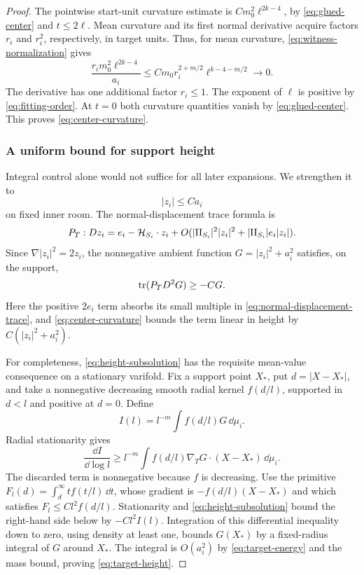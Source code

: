 \begin{proof}
The pointwise start-unit curvature estimate is
$Cm_0^2\ell^{2k-4}$, by \eqref{eq:glued-center} and $t\le2\ell$.
Mean curvature and its first normal derivative acquire factors
$r_i$ and $r_i^2$, respectively, in target units. Thus, for mean
curvature, \eqref{eq:witness-normalization} gives
\[
 \frac{r_i m_0^2\ell^{2k-4}}{a_i}
       \le Cm_0r_i^{2+m/2}\ell^{k-4-m/2}\longrightarrow0.
\]
The derivative has one additional factor $r_i\le1$. The exponent of
$\ell$ is positive by \eqref{eq:fitting-order}. At $t=0$ both
curvature quantities vanish by \eqref{eq:glued-center}. This proves
\eqref{eq:center-curvature}.

\subsubsection*{A uniform bound for support height}
Integral control alone would not suffice for all later expansions.
We strengthen it to
\begin{equation}\label{eq:target-height}
 |z_i|\le Ca_i
\end{equation}
on fixed inner room. The normal-displacement trace formula
\cite[Equation~(7.9)]{AE} is
\begin{equation}\label{eq:normal-displacement-trace}
 P_T:Dz_i=e_i-\mathcal H_{S_i}\cdot z_i
       +O(|\mathrm{II}_{S_i}|^2|z_i|^2+|\mathrm{II}_{S_i}|e_i|z_i|).
\end{equation}
Since $\nabla|z_i|^2=2z_i$, the nonnegative ambient function
$G=|z_i|^2+a_i^2$ satisfies, on the support,
\begin{equation}\label{eq:height-subsolution}
 \operatorname{tr}(P_TD^2G)\ge-CG.
\end{equation}
Here the positive $2e_i$ term absorbs its small multiple in
\eqref{eq:normal-displacement-trace}, and
\eqref{eq:center-curvature} bounds the term linear in height by
$C(|z_i|^2+a_i^2)$.

For completeness, \eqref{eq:height-subsolution} has the requisite
mean-value consequence on a stationary varifold. Fix a support point
$X_*$, put $d=|X-X_*|$, and take a nonnegative decreasing smooth
radial kernel $f(d/l)$, supported in $d<l$ and positive at $d=0$.
Define
\[
 I(l)=l^{-m}\int f(d/l)G\,\dd\mu_i.
\]
Radial stationarity gives
\[
 \frac{\dd I}{\dd\log l}
 \ge l^{-m}\int f(d/l)\nabla_TG\cdot(X-X_*)\,\dd\mu_i.
\]
The discarded term is nonnegative because $f$ is decreasing.
Use the primitive
$F_l(d)=\int_d^\infty t f(t/l)\,\dd t$, whose gradient is
$-f(d/l)(X-X_*)$ and which satisfies
$F_l\le Cl^2f(d/l)$. Stationarity and
\eqref{eq:height-subsolution} bound the right-hand side below by
$-Cl^2I(l)$. Integration of this differential inequality down to zero, using
density at least one, bounds $G(X_*)$ by a fixed-radius integral
of $G$ around $X_*$. The integral is $O(a_i^2)$ by
\eqref{eq:target-energy} and the mass bound, proving
\eqref{eq:target-height}.


\end{proof}
